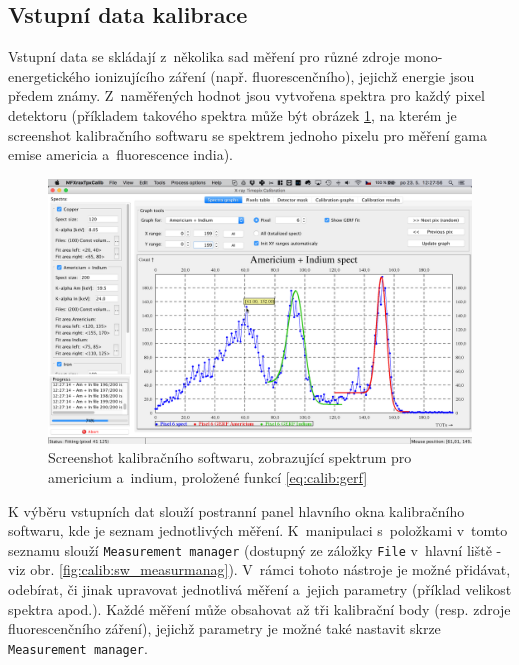 \subsection{Vstupní data kalibrace}
Vstupní data se skládají z~několika sad měření pro různé zdroje mono-energetického ionizujícího záření (např. fluorescenčního), jejichž energie jsou předem známy. Z~naměřených hodnot jsou vytvořena spektra pro každý pixel detektoru (příkladem takového spektra může být obrázek \ref{fig:calib:sw_spektra}, na kterém je screenshot kalibračního softwaru se spektrem jednoho pixelu pro měření gama emise americia a~fluorescence india).

\begin{figure}[t]
	\begin{center}
		\includegraphics[width=15cm]{figures/calibsw_spectra_all.png}
		\caption{Screenshot kalibračního softwaru, zobrazující spektrum pro americium a~indium, proložené funkcí \ref{eq:calib:gerf}}
		\label{fig:calib:sw_spektra}
	\end{center}
\end{figure}

K výběru vstupních dat slouží postranní panel hlavního okna kalibračního softwaru, kde je seznam jednotlivých měření. K~manipulaci s~položkami v~tomto seznamu slouží \texttt{Measurement manager} (dostupný ze záložky \texttt{File} v~hlavní liště - viz obr. \ref{fig:calib:sw_measurmanag}). V~rámci tohoto nástroje je možné přidávat, odebírat, či jinak upravovat jednotlivá měření a~jejich parametry (příklad velikost spektra apod.). Každé měření může obsahovat až tři kalibrační body (resp. zdroje fluorescenčního záření), jejichž parametry je možné také nastavit skrze \texttt{Measurement manager}.

